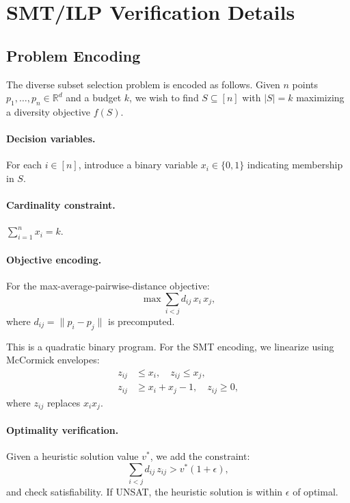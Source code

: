 \documentclass[11pt,a4paper]{article}
\newcommand{\R}{\mathbb{R}}
\begin{document}
\section{SMT/ILP Verification Details}\label{app:smt}

\subsection{Problem Encoding}

The diverse subset selection problem is encoded as follows.
Given $n$ points $p_1, \ldots, p_n \in \R^d$ and a budget $k$,
we wish to find $S \subseteq [n]$ with $|S| = k$ maximizing
a diversity objective $f(S)$.

\paragraph{Decision variables.}
For each $i \in [n]$, introduce a binary variable $x_i \in
\{0, 1\}$ indicating membership in $S$.

\paragraph{Cardinality constraint.}
$\sum_{i=1}^n x_i = k$.

\paragraph{Objective encoding.}
For the max-average-pairwise-distance objective:
\begin{equation}
  \max \sum_{i < j} d_{ij}\,x_i\,x_j,
\end{equation}
where $d_{ij} = \|p_i - p_j\|$ is precomputed.

This is a quadratic binary program.  For the SMT encoding,
we linearize using McCormick envelopes:
\begin{align}
  z_{ij} &\leq x_i, \quad z_{ij} \leq x_j, \\
  z_{ij} &\geq x_i + x_j - 1, \quad z_{ij} \geq 0,
\end{align}
where $z_{ij}$ replaces $x_i x_j$.

\paragraph{Optimality verification.}
Given a heuristic solution value $v^*$, we add the constraint:
\begin{equation}
  \sum_{i < j} d_{ij}\,z_{ij} > v^*(1 + \epsilon),
\end{equation}
and check satisfiability.  If UNSAT, the heuristic solution
is within $\epsilon$ of optimal.
\end{document}
